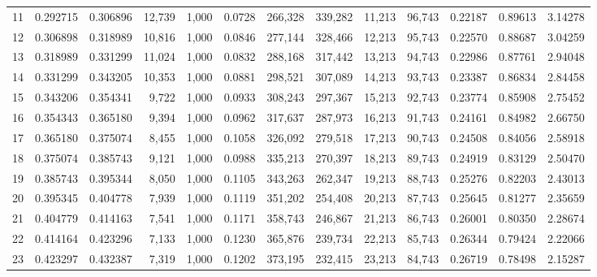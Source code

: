 \begin{tabular}{rrrrrrrrrrrrr}
11  &  0.292715 &  0.306896 &  12,739 &  1,000 &                                     0.0728 &  266,328 &  339,282 &   11,213 &   96,743 &  0.22187 &  0.89613 &  3.14278 \\
12  &  0.306898 &  0.318989 &  10,816 &  1,000 &                                     0.0846 &  277,144 &  328,466 &   12,213 &   95,743 &  0.22570 &  0.88687 &  3.04259 \\
13  &  0.318989 &  0.331299 &  11,024 &  1,000 &                                     0.0832 &  288,168 &  317,442 &   13,213 &   94,743 &  0.22986 &  0.87761 &  2.94048 \\
14  &  0.331299 &  0.343205 &  10,353 &  1,000 &                                     0.0881 &  298,521 &  307,089 &   14,213 &   93,743 &  0.23387 &  0.86834 &  2.84458 \\
15  &  0.343206 &  0.354341 &   9,722 &  1,000 &                                     0.0933 &  308,243 &  297,367 &   15,213 &   92,743 &  0.23774 &  0.85908 &  2.75452 \\
16  &  0.354343 &  0.365180 &   9,394 &  1,000 &                                     0.0962 &  317,637 &  287,973 &   16,213 &   91,743 &  0.24161 &  0.84982 &  2.66750 \\
17  &  0.365180 &  0.375074 &   8,455 &  1,000 &                                     0.1058 &  326,092 &  279,518 &   17,213 &   90,743 &  0.24508 &  0.84056 &  2.58918 \\
18  &  0.375074 &  0.385743 &   9,121 &  1,000 &                                     0.0988 &  335,213 &  270,397 &   18,213 &   89,743 &  0.24919 &  0.83129 &  2.50470 \\
19  &  0.385743 &  0.395344 &   8,050 &  1,000 &                                     0.1105 &  343,263 &  262,347 &   19,213 &   88,743 &  0.25276 &  0.82203 &  2.43013 \\
20  &  0.395345 &  0.404778 &   7,939 &  1,000 &                                     0.1119 &  351,202 &  254,408 &   20,213 &   87,743 &  0.25645 &  0.81277 &  2.35659 \\
21  &  0.404779 &  0.414163 &   7,541 &  1,000 &                                     0.1171 &  358,743 &  246,867 &   21,213 &   86,743 &  0.26001 &  0.80350 &  2.28674 \\
22  &  0.414164 &  0.423296 &   7,133 &  1,000 &                                     0.1230 &  365,876 &  239,734 &   22,213 &   85,743 &  0.26344 &  0.79424 &  2.22066 \\
23  &  0.423297 &  0.432387 &   7,319 &  1,000 &                                     0.1202 &  373,195 &  232,415 &   23,213 &   84,743 &  0.26719 &  0.78498 &  2.15287 \\

\end{tabular}
